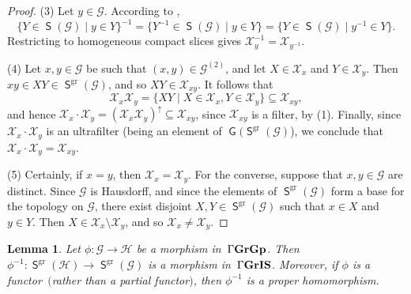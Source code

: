 \documentclass[a4paper,reqno,12pt]{amsart}
\numberwithin{equation}{section}
\theoremstyle{plain}
\newtheorem{lemma}[thm]{Lemma}
\theoremstyle{definition}
\newcommand{\gr}{\operatorname{gr}}
\newcommand{\GIS}{\operatorname{\Gamma\bf{GrIS}}}
\newcommand{\GG}{\operatorname{\Gamma\bf{GrGp}}}
\newcommand{\SG}{\operatorname{\mathsf{S}}}
\newcommand{\GP}{\operatorname{\mathsf{G}}}
\begin{document}
\begin{proof}
\smallskip

(3) Let $y \in \mathscr{G}$. According to \cite[Lemma 2.36(3)]{Lawson3},
\[\big\{Y \in \SG(\mathscr{G}) \mid y \in Y\big\}^{-1} = \big\{Y^{-1} \in \SG(\mathscr{G}) \mid y \in Y\big\} = \big\{Y \in \SG(\mathscr{G}) \mid y^{-1} \in Y\big\}.\] 
Restricting to homogeneous compact slices gives $\mathcal{X}_y^{-1} = \mathcal{X}_{y^{-1}}$.

\smallskip

(4) Let $x,y \in \mathscr{G}$ be such that $(x,y) \in \mathscr{G}^{(2)}$, and let $X \in \mathcal{X}_x$ and $Y \in \mathcal{X}_y$. Then $xy \in XY \in \SG^{\gr}(\mathscr{G})$, and so $XY \in \mathcal{X}_{xy}$. It follows that 
\[\mathcal{X}_x\mathcal{X}_y = \big\{XY \mid X \in \mathcal{X}_x, Y \in \mathcal{X}_y\big\} \subseteq \mathcal{X}_{xy},\]
and hence $\mathcal{X}_x \cdot \mathcal{X}_y = (\mathcal{X}_x \mathcal{X}_y)^{\uparrow} \subseteq \mathcal{X}_{xy}$, since $\mathcal{X}_{xy}$ is a filter, by (1). Finally, since $\mathcal{X}_x \cdot \mathcal{X}_y$ is an ultrafilter (being an element of $\GP(\SG^{\gr}(\mathscr{G})$), we conclude that $\mathcal{X}_x \cdot \mathcal{X}_y = \mathcal{X}_{xy}$.

\smallskip

(5) Certainly, if $x=y$, then $\mathcal{X}_x = \mathcal{X}_y$. For the converse, suppose that $x,y \in \mathscr{G}$ are distinct. Since $\mathscr{G}$ is Hausdorff, and since the elements of $\SG^{\gr}(\mathscr{G})$ form a base for the topology on $\mathscr{G}$, there exist disjoint $X, Y \in \SG^{\gr}(\mathscr{G})$ such that $x\in X$ and $y \in Y$. Then $X \in \mathcal{X}_x \setminus \mathcal{X}_y$, and so $\mathcal{X}_x \neq \mathcal{X}_y$.
\end{proof}

\begin{lemma} \label{gr-inv-morph}
Let $\phi: \mathscr{G} \to \mathscr{H}$ be a morphism in $\, \GG$. Then $\phi^{-1} : \SG^{\gr}(\mathscr{H}) \to \SG^{\gr}(\mathscr{G})$ is a morphism in $\, \GIS$. Moreover, if $\phi$ is a functor $\, ($rather than a partial functor$)$, then $\phi^{-1}$ is a proper homomorphism.
\end{lemma}
\end{document}
